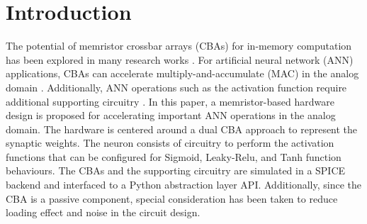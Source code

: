 \ResetPicDir{}

\section{Introduction}

The potential of memristor crossbar arrays (CBAs) for in-memory computation has been explored in many research works \cite{CAMPBELL201710, Strukov_Snider_Stewart_Williams_2008, Zou_Xu_Chen_Yan_Han_2021}. For artificial neural network (ANN) applications, CBAs can accelerate multiply-and-accumulate (MAC) in the analog domain \cite{Crafton_West_Basnet_Vogel_Raychowdhury_2019, Ielmini_2016}. Additionally, ANN operations such as the activation function require additional supporting circuitry \cite{Sun_Ielmini_2022}. In this paper, a memristor-based hardware design is proposed for accelerating important ANN operations in the analog domain. The hardware is centered around a dual CBA approach to represent the synaptic weights. The neuron consists of circuitry to perform the activation functions that can be configured for Sigmoid, Leaky-Relu, and Tanh function behaviours. The CBAs and the supporting circuitry are simulated in a SPICE backend and interfaced to a Python abstraction layer API. Additionally, since the CBA is a passive component, special consideration has been taken to reduce loading effect and noise in the circuit design.
